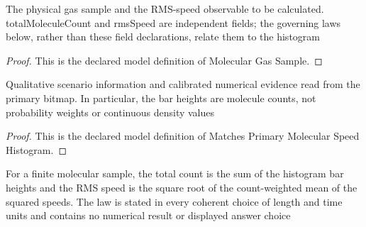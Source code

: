 \begin{definition}
  \label{def:physics:phyx-mini-0378:phyxminiproblems-problemphyxmini0378-moleculargassample}
  The physical gas sample and the RMS-speed observable to be calculated. totalMoleculeCount and rmsSpeed are independent fields; the governing laws below, rather than these field declarations, relate them to the histogram
\end{definition}
\begin{proof}
  This is the declared model definition of Molecular Gas Sample.
\end{proof}
\begin{definition}
  \label{def:physics:phyx-mini-0378:phyxminiproblems-problemphyxmini0378-matchesprimarymolecularspeedhistogram}
  Qualitative scenario information and calibrated numerical evidence read from the primary bitmap. In particular, the bar heights are molecule counts, not probability weights or continuous density values
\end{definition}
\begin{proof}
  This is the declared model definition of Matches Primary Molecular Speed Histogram.
\end{proof}
\begin{definition}
  \label{def:physics:phyx-mini-0378:phyxminiproblems-problemphyxmini0378-satisfiesdiscretemolecularrmslaw}
  For a finite molecular sample, the total count is the sum of the histogram bar heights and the RMS speed is the square root of the count-weighted mean of the squared speeds. The law is stated in every coherent choice of length and time units and contains no numerical result or displayed answer choice
\end{definition}

